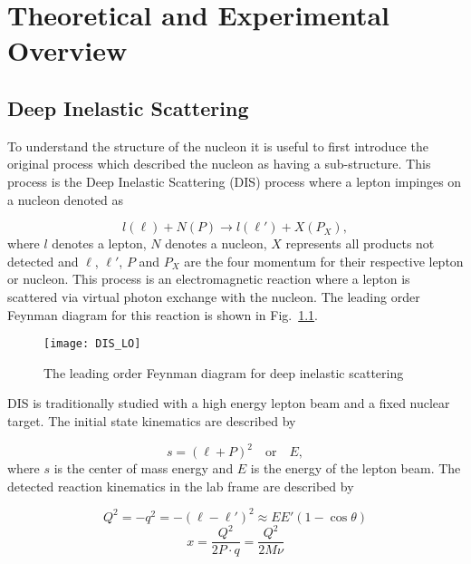 \chapter{Theoretical and Experimental Overview} \label{ch::theory_exp}
\ifpdf
\graphicspath{{Chapters/Theory/Figs/}}
\fi

\section{Deep Inelastic Scattering}
To understand the structure of the nucleon it is useful to first introduce the
original process which described the nucleon as having a sub-structure.  This
process is the Deep Inelastic Scattering (DIS) process where a lepton impinges
on a nucleon denoted as

\begin{equation}
l(\ell) + N(P) \rightarrow l(\ell') + X(P_X),
\end{equation}
\noindent
where $l$ denotes a lepton, $N$ denotes a nucleon, $X$ represents all products
not detected and $\ell$, $\ell'$, $P$ and $P_X$ are the four momentum for their
respective lepton or nucleon.  This process is an electromagnetic reaction where
a lepton is scattered via virtual photon exchange with the nucleon.  The
leading order Feynman diagram for this reaction is shown in
Fig.~\ref{fig::DIS_LO}.

\begin{figure}[h!t]
  \centering
  \texttt{[image: DIS\_LO]}
  \caption{The leading order Feynman diagram for deep inelastic scattering}
  \label{fig::DIS_LO}
\end{figure}

DIS is traditionally studied with a high energy lepton beam and a fixed nuclear
target.  The initial state kinematics are described by

\begin{equation}
  s = (\ell+P)^2 \quad \mathrm{or} \quad E,
\end{equation}
\noindent
where $s$ is the center of mass energy and $E$ is the energy of the lepton beam.
The detected reaction kinematics in the lab frame are described by

\begin{multicols}{2}
  \noindent
  \begin{equation}
    \label{equ::DIS_Q2}
    Q^2 = -q^2 = -(\ell - \ell')^2 \approx EE'(1-\cos\theta )
  \end{equation}
  \begin{equation}
      \label{equ::BjorkenX}
      x = \frac{Q^2}{2P \cdot q} = \frac{Q^2}{2M\nu}
  \end{equation}
\end{multicols}

